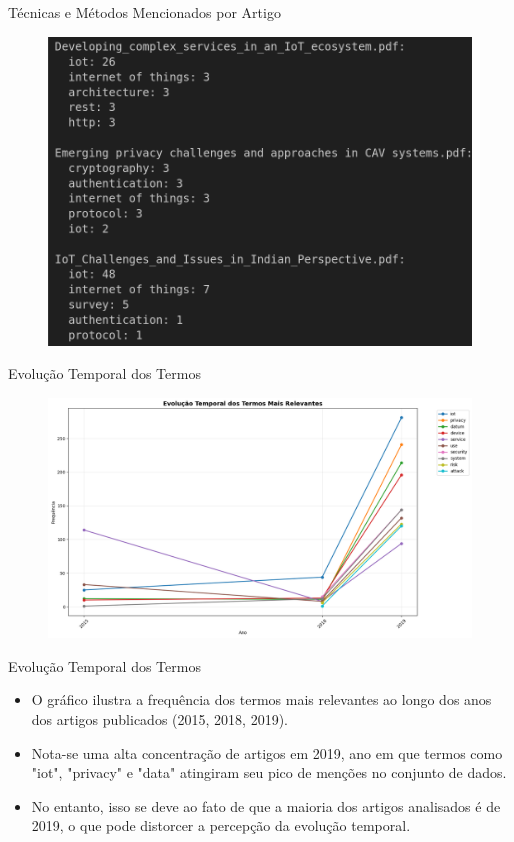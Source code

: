 \documentclass{beamer}
\begin{document}
\begin{frame}{Técnicas e Métodos Mencionados por Artigo}
    \begin{figure}
        \centering
        \includegraphics[width=\textwidth]{img/exemplo-tecnica.png}
    \end{figure}
\end{frame}

\begin{frame}{Evolução Temporal dos Termos}
    \begin{figure}
        \centering
        \includegraphics[width=\textwidth]{img/evolucao-temporal.png}
    \end{figure}
\end{frame}

\begin{frame}{Evolução Temporal dos Termos}
    \begin{itemize}
        \item O gráfico ilustra a frequência dos termos mais relevantes ao longo dos anos dos artigos publicados (2015, 2018, 2019).
        \item Nota-se uma alta concentração de artigos em 2019, ano em que termos como "iot", "privacy" e "data" atingiram seu pico de menções no conjunto de dados.
        \item No entanto, isso se deve ao fato de que a maioria dos artigos analisados é de 2019, o que pode distorcer a percepção da evolução temporal.
    \end{itemize}
\end{frame}
\end{document}
